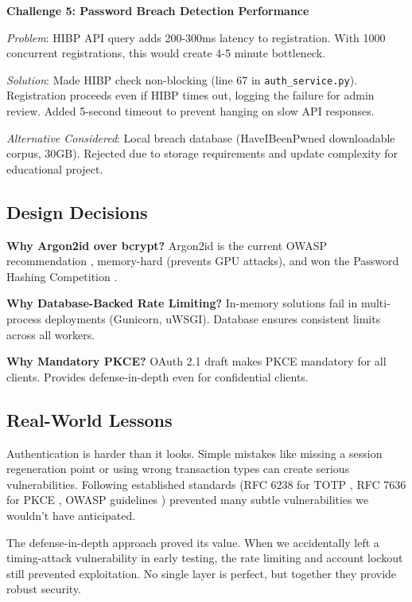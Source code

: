 \documentclass[12pt,a4paper]{article}
\begin{document}
\textbf{Challenge 5: Password Breach Detection Performance}

\textit{Problem}: HIBP API query adds 200-300ms latency to registration. With 1000 concurrent registrations, this would create 4-5 minute bottleneck.

\textit{Solution}: Made HIBP check non-blocking (line 67 in \texttt{auth\_service.py}). Registration proceeds even if HIBP times out, logging the failure for admin review. Added 5-second timeout to prevent hanging on slow API responses.

\textit{Alternative Considered}: Local breach database (HaveIBeenPwned downloadable corpus, 30GB). Rejected due to storage requirements and update complexity for educational project.

\subsection{Design Decisions}

\textbf{Why Argon2id over bcrypt?} Argon2id is the current OWASP recommendation \cite{owasp_password}, memory-hard (prevents GPU attacks), and won the Password Hashing Competition \cite{biryukov2016}.

\textbf{Why Database-Backed Rate Limiting?} In-memory solutions fail in multi-process deployments (Gunicorn, uWSGI). Database ensures consistent limits across all workers.

\textbf{Why Mandatory PKCE?} OAuth 2.1 draft makes PKCE mandatory for all clients. Provides defense-in-depth even for confidential clients.

\subsection{Real-World Lessons}

Authentication is harder than it looks. Simple mistakes like missing a session regeneration point or using wrong transaction types can create serious vulnerabilities. Following established standards (RFC 6238 for TOTP \cite{mraihi2011}, RFC 7636 for PKCE \cite{sakimura2015}, OWASP guidelines \cite{owasp_password}) prevented many subtle vulnerabilities we wouldn't have anticipated.

The defense-in-depth approach proved its value. When we accidentally left a timing-attack vulnerability in early testing, the rate limiting and account lockout still prevented exploitation. No single layer is perfect, but together they provide robust security.
\end{document}

